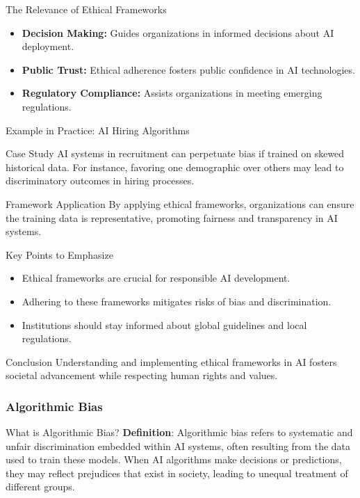 \documentclass[aspectratio=169]{beamer}
\begin{document}
\begin{frame}[fragile]{The Relevance of Ethical Frameworks}
    \begin{itemize}
        \item \textbf{Decision Making:} Guides organizations in informed decisions about AI deployment.
        \item \textbf{Public Trust:} Ethical adherence fosters public confidence in AI technologies.
        \item \textbf{Regulatory Compliance:} Assists organizations in meeting emerging regulations.
    \end{itemize}
\end{frame}

\begin{frame}[fragile]{Example in Practice: AI Hiring Algorithms}
    \begin{block}{Case Study}
        AI systems in recruitment can perpetuate bias if trained on skewed historical data. For instance, favoring one demographic over others may lead to discriminatory outcomes in hiring processes.
    \end{block}
    
    \begin{block}{Framework Application}
        By applying ethical frameworks, organizations can ensure the training data is representative, promoting fairness and transparency in AI systems.
    \end{block}
\end{frame}

\begin{frame}[fragile]{Key Points to Emphasize}
    \begin{itemize}
        \item Ethical frameworks are crucial for responsible AI development.
        \item Adhering to these frameworks mitigates risks of bias and discrimination.
        \item Institutions should stay informed about global guidelines and local regulations.
    \end{itemize}
\end{frame}

\begin{frame}[fragile]{Conclusion}
    Understanding and implementing ethical frameworks in AI fosters societal advancement while respecting human rights and values.
\end{frame}

\begin{frame}[fragile]
    \frametitle{Algorithmic Bias}
    \begin{block}{What is Algorithmic Bias?}
        \textbf{Definition}: Algorithmic bias refers to systematic and unfair discrimination embedded within AI systems, often resulting from the data used to train these models. When AI algorithms make decisions or predictions, they may reflect prejudices that exist in society, leading to unequal treatment of different groups.
    \end{block}
\end{frame}
\end{document}

